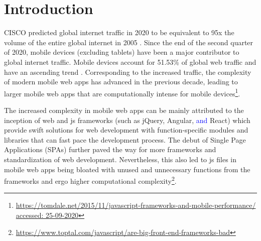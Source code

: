 \section{Introduction}




CISCO predicted global internet traffic in 2020 to be equivalent to 95x the volume of the entire global internet in 2005 \cite{ciscoforecast}. Since the end of the second quarter of 2020, mobile devices (excluding tablets) have been a major contributor to global internet traffic. Mobile devices account for 51.53\% of global web traffic and have an ascending trend \cite{ciscoforecast}. Corresponding to the increased traffic, the complexity of modern mobile web apps has advanced in the previous decade, leading to larger mobile web apps that are computationally intense for mobile devices\textcolor{blue}{\footnote{\url{https://tomdale.net/2015/11/javascript-frameworks-and-mobile-performance/ accessed: 25-09-2020}}}.

The increased complexity in mobile web apps can be mainly attributed to the inception of web and \acrfull{js} frameworks (such as jQuery, Angular, \textcolor{blue}{and} React) \cite{persson2020javascript} which provide swift solutions for web development with function-specific modules and libraries that can fast pace the development process. The debut of Single Page Applications (SPAs) further paved the way for more frameworks and standardization of web development. Nevertheless, this also led to \acrshort{js} files in mobile web apps being bloated with unused and unnecessary functions from the frameworks and ergo higher computational complexity\textcolor{blue}{\footnote{\url{https://www.toptal.com/javascript/are-big-front-end-frameworks-bad}}}.

